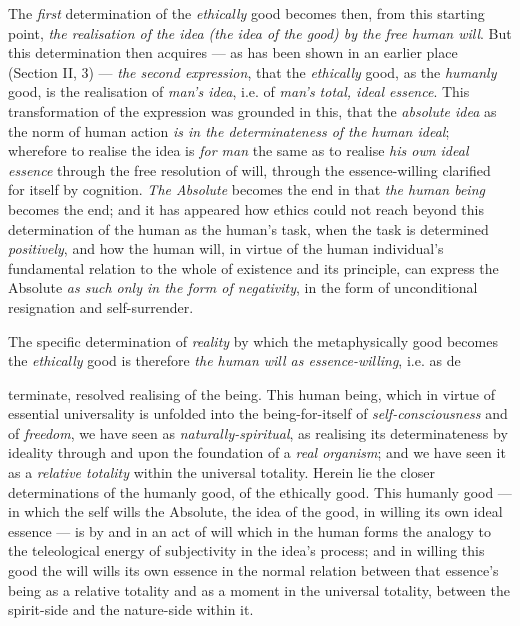 \documentclass[12pt,a4paper]{book}
\begin{document}
The \emph{first} determination of the \emph{ethically} good becomes then, from
this starting point, \emph{the realisation of the idea (the idea of the good) by
the free human will}. But this determination then acquires --- as has been shown
in an earlier place (Section II, 3) --- \emph{the second expression}, that the
\emph{ethically} good, as the \emph{humanly} good, is the realisation of
\emph{man's idea}, i.e. of \emph{man's total, ideal essence}. This
transformation of the expression was grounded in this, that the \emph{absolute
idea} as the norm of human action \emph{is in the determinateness of the human
ideal}; wherefore to realise the idea is \emph{for man} the same as to realise
\emph{his own ideal essence} through the free resolution of will, through the
essence-willing clarified for itself by cognition. \emph{The Absolute} becomes
the end in that \emph{the human being} becomes the end; and it has appeared how
ethics could not reach beyond this determination of the human as the human's
task, when the task is determined \emph{positively}, and how the human will, in
virtue of the human individual's fundamental relation to the whole of existence
and its principle, can express the Absolute \emph{as such only in the form of
negativity}, in the form of unconditional resignation and self-surrender.

The specific determination of \emph{reality} by which the metaphysically good
becomes the \emph{ethically} good is therefore \emph{the human will as
essence-willing}, i.e. as de\-%

terminate, resolved realising of the being. This human being, which in virtue
of essential universality is unfolded into the being-for-itself of
\emph{self-consciousness} and of \emph{freedom}, we have seen as
\emph{naturally-spiritual}, as realising its determinateness by ideality
through and upon the foundation of a \emph{real organism}; and we have seen it
as a \emph{relative totality} within the universal totality. Herein lie the
closer determinations of the humanly good, of the ethically good. This humanly
good --- in which the self wills the Absolute, the idea of the good, in willing
its own ideal essence --- is by and in an act of will which in the human forms
the analogy to the teleological energy of subjectivity in the idea's process;
and in willing this good the will wills its own essence in the normal relation
between that essence's being as a relative totality and as a moment in the
universal totality, between the spirit-side and the nature-side within it.
\end{document}
